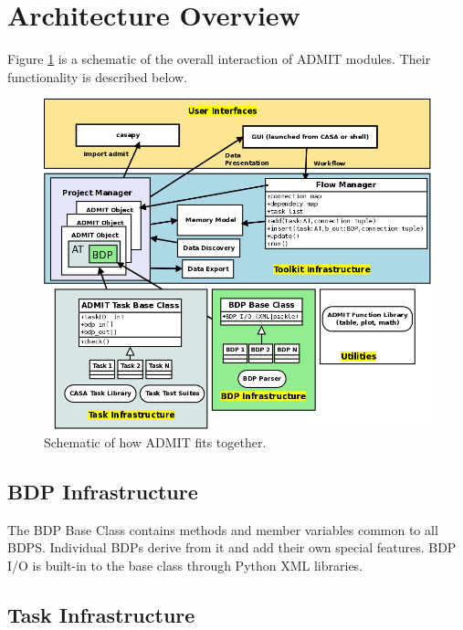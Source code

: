 \documentclass[preprint]{aastex}
\begin{document}
\clearpage


\section{Architecture Overview}\label{s-arch}


Figure \ref{admitarchitecture} is a schematic of the overall interaction
of ADMIT modules. Their functionality is described below.

\begin{figure}[H]
\begin{center}
\includegraphics[scale=0.45]{AdmitArchitecture.png}
\end{center}
\caption{ Schematic of how ADMIT fits together. }
\label{admitarchitecture}
\end{figure}


\subsection{BDP Infrastructure}

The BDP Base Class contains methods and member variables common to all BDPS.
Individual BDPs derive from it and add their own special features.  BDP I/O
is built-in to the base class through Python XML libraries.

\subsection{Task Infrastructure}
\end{document}

